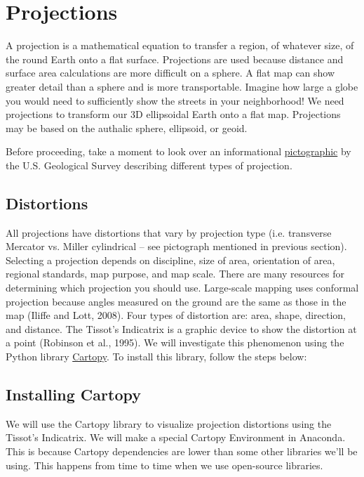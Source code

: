 \documentclass[a4paper , 12pt]{book}
\begin{document}
\section{Projections} \label{projections}

A projection is a mathematical equation to transfer a region, of whatever size, of the round Earth onto a flat surface. Projections are used because distance and surface area calculations are more difficult on a sphere. A flat map can show greater detail than a sphere and is more transportable. Imagine how large a globe you would need to sufficiently show the streets in your neighborhood! We need projections to transform our 3D ellipsoidal Earth onto a flat map. Projections may be based on the authalic sphere, ellipsoid, or geoid.

Before proceeding, take a moment to look over an informational \href{https://pubs.usgs.gov/gip/70047422/report.pdf}{pictographic} by the U.S. Geological Survey describing different types of projection.

\subsection{Distortions}

All projections have distortions that vary by projection type (i.e. transverse Mercator vs. Miller cylindrical – see pictograph mentioned in previous section). Selecting a projection depends on discipline, size of area, orientation of area, regional standards, map purpose, and map scale. There are many resources for determining which projection you should use. Large-scale mapping uses conformal projection because angles measured on the ground are the same as those in the map (Iliffe and Lott, 2008). Four types of distortion are: area, shape, direction, and distance. The Tissot’s Indicatrix is a graphic device to show the distortion at a point (Robinson et al., 1995). We will investigate this phenomenon using the Python library \href{https://scitools.org.uk/cartopy/docs/latest/#}{Cartopy}. To install this library, follow the steps below:

\subsection*{Installing Cartopy}

We will use the Cartopy library to visualize projection distortions using the Tissot’s Indicatrix. We will make a special Cartopy Environment in Anaconda. This is because Cartopy dependencies are lower than some other libraries we’ll be using. This happens from time to time when we use open-source libraries.
\end{document}
